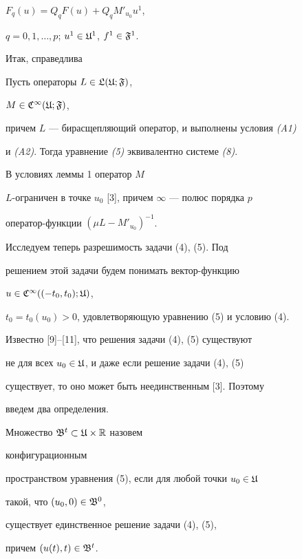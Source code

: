 $F_q(u)=Q_qF(u)+Q_qM'_{u_0}u^1$,


$q=0,1,\dotsc,p$; $u^1\in\frak U^1$, $f^1\in\frak F^1$.





Итак, справедлива





\begin{lem} Пусть операторы $L\in\frak L(\frak U;\frak F)$,


$M\in\frak C^\infty(\frak U;\frak F)$,


причем $L$ --- бирасщепляющий оператор, и выполнены условия {\em (A1)}


и {\em (A2)}. Тогда уравнение {\em (5)} эквивалентно системе {\em (8)}.


\end{lem}





\begin{note} В условиях леммы 1 оператор $M$


$L$-ограничен в точке $u_0$ [3], причем $\infty$ --- полюс порядка $p$


оператор-функции $(\mu L-M'_{u_0})^{-1}$.


\end{note}





Исследуем теперь разрешимость задачи (4), (5). Под


решением этой задачи будем понимать вектор-функцию


$u\in\frak C^\infty((-t_0,t_0);\frak U)$,


$t_0=t_0(u_0)>0$, удовлетворяющую уравнению (5) и условию (4).





Известно [9]--[11], что решения задачи (4), (5) существуют


не для всех $u_0\in\frak U$, и даже если решение задачи (4), (5)


существует, то оно может быть неединственным [3]. Поэтому


введем два определения.





\begin{defn} Множество $\frak B^t\subset\frak U\times\Bbb R$ назовем


конфигурационным


пространством уравнения (5), если для любой точки $u_0\in\frak U$


такой, что $(u_0,0)\in\frak B^0$,


существует единственное решение задачи (4), (5),


причем $(u(t),t)\in\frak B^t$.


\end{defn}





